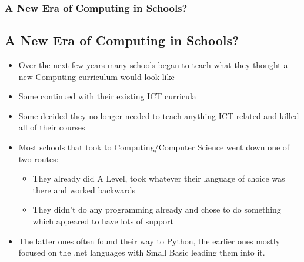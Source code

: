 \documentclass{beamer}
\begin{document}
\begin{frame}
  \frametitle{A New Era of Computing in Schools?}
  \subsection{A New Era of Computing in Schools?}
  \begin{itemize}
    
  \item Over the next few years many schools began to teach what they thought a new Computing curriculum would look
    like
    
  \item Some continued with their existing ICT curricula
    
  \item Some decided they no longer needed to teach anything ICT related and killed all of their courses
    
  \item Most schools that took to Computing/Computer Science went down one of two routes:
    
    \begin{itemize}
      
    \item They already did A Level, took whatever their language of choice was there and worked backwards
      
    \item They didn't do any programming already and chose to do something which appeared to have lots of support
    \end{itemize}
    
  \item The latter ones often found their way to Python, the earlier ones mostly focused on the .net languages with
    Small Basic leading them into it.
  \end{itemize}
 
\end{frame}
\end{document}
